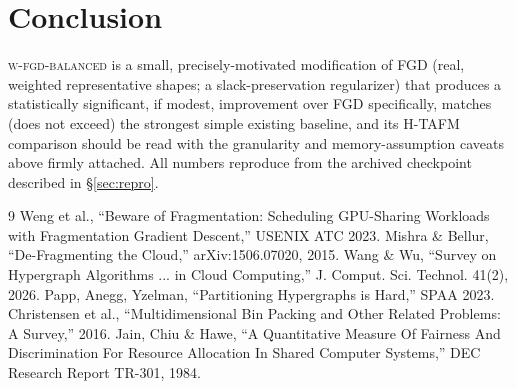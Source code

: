 \documentclass[11pt]{article}
\begin{document}
\section{Conclusion}
\textsc{w-fgd-balanced} is a small, precisely-motivated modification of
FGD (real, weighted representative shapes; a slack-preservation
regularizer) that produces a statistically significant, if modest,
improvement over FGD specifically, matches (does not exceed) the
strongest simple existing baseline, and its H-TAFM comparison should be
read with the granularity and memory-assumption caveats above firmly
attached. All numbers reproduce from the archived checkpoint described in
\S\ref{sec:repro}.

\begin{thebibliography}{9}
 Weng et al., ``Beware of Fragmentation: Scheduling
  GPU-Sharing Workloads with Fragmentation Gradient Descent,'' USENIX ATC 2023.
 Mishra \& Bellur, ``De-Fragmenting the Cloud,'' arXiv:1506.07020, 2015.
 Wang \& Wu, ``Survey on Hypergraph Algorithms
  ... in Cloud Computing,'' J. Comput. Sci. Technol. 41(2), 2026.
 Papp, Anegg, Yzelman, ``Partitioning
  Hypergraphs is Hard,'' SPAA 2023.
 Christensen et al., ``Multidimensional Bin
  Packing and Other Related Problems: A Survey,'' 2016.
 Jain, Chiu \& Hawe, ``A Quantitative Measure Of Fairness
  And Discrimination For Resource Allocation In Shared Computer Systems,''
  DEC Research Report TR-301, 1984.
\end{thebibliography}
\end{document}
